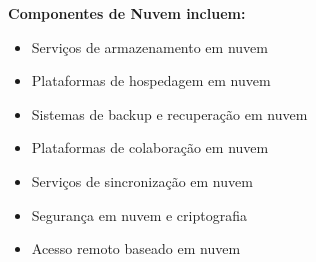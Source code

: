 	\textbf{Componentes de Nuvem incluem:}
	
	\begin{itemize}
		\item Serviços de armazenamento em nuvem
		\item Plataformas de hospedagem em nuvem
		\item Sistemas de backup e recuperação em nuvem
		\item Plataformas de colaboração em nuvem
		\item Serviços de sincronização em nuvem
		\item Segurança em nuvem e criptografia
		\item Acesso remoto baseado em nuvem
	\end{itemize}

